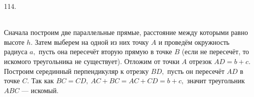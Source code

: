 114. \begin{figure}[ht!]
\end{figure}\\
Сначала построим две параллельные прямые, расстояние между которыми равно высоте $h.$ Затем выберем на одной из них точку $A$ и проведём окружность радиуса $a,$ пусть она пересечёт вторую прямую в точке $B$ (если не пересечёт, то искомого треугольника не существует). Отложим от точки $A$ отрезок $AD=b+c.$ Построим серединный перпендикуляр к отрезку $BD,$ пусть он пересечёт $AD$ в точке $C.$ Так как $BC=CD,\ AC+BC=AC+CD=b+c,$ значит треугольник $ABC$ --- искомый.\newpage\noindent
